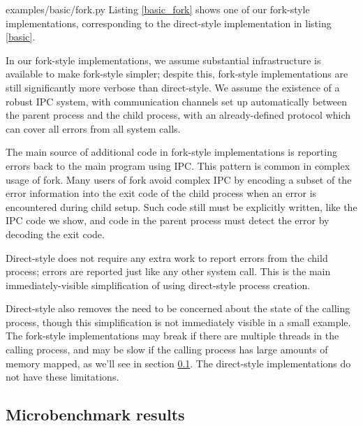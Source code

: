 \documentclass[letterpaper,twocolumn,10pt]{article}
\begin{document}

{examples/basic/fork.py}
Listing \ref{basic_fork} shows one of our fork-style implementations,
corresponding to the direct-style implementation in listing \ref{basic}.

In our fork-style implementations,
we assume substantial infrastructure is available to make fork-style simpler;
despite this, fork-style implementations are still significantly more verbose than direct-style.
We assume the existence of a robust IPC system,
with communication channels set up automatically between the parent process and the child process,
with an already-defined protocol which can cover all errors from all system calls.

The main source of additional code in fork-style implementations
is reporting errors back to the main program using IPC.
This pattern is common in complex usage of fork.\cite{posix_spawn_error_pipe}\cite{python_subprocess_errpipe}
Many users of fork avoid complex IPC
by encoding a subset of the error information into the exit code of the child process
when an error is encountered during child setup.
Such code still must be explicitly written, like the IPC code we show,
and code in the parent process must detect the error by decoding the exit code.

Direct-style does not require any extra work to report errors from the child process;
errors are reported just like any other system call.
This is the main immediately-visible simplification of using direct-style process creation.

Direct-style also removes the need to be concerned about the state of the calling process,
though this simplification is not immediately visible in a small example.
The fork-style implementations may break if there are multiple threads in the calling process,
and may be slow if the calling process has large amounts of memory mapped, as we'll see in section \ref{subprocess_bench}.
The direct-style implementations do not have these limitations.
\subsection{Microbenchmark results}\label{subprocess_bench}
\end{document}
